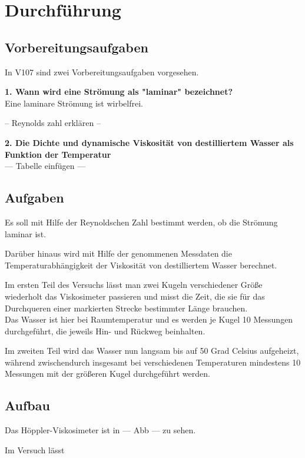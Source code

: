\section{Durchführung}
\label{sec:Durchführung}

\subsection{Vorbereitungsaufgaben}

In V107 sind zwei Vorbereitungsaufgaben vorgesehen.

\textbf{1. Wann wird eine Strömung als "laminar" bezeichnet?} \\
Eine laminare Strömung ist wirbelfrei.

-- Reynolds zahl erklären -- 


\textbf{2. Die Dichte und dynamische Viskosität von destilliertem Wasser als Funktion der Temperatur}\\
 --- Tabelle einfügen ---




\subsection{Aufgaben}
\label{subsec:Aufgaben}

Es soll mit Hilfe der Reynoldschen Zahl bestimmt werden, ob die Strömung laminar ist.

Darüber hinaus wird mit Hilfe der genommenen Messdaten die Temperaturabhängigkeit der Viskosität von
destilliertem Wasser berechnet. 

Im ersten Teil des Versuchs lässt man zwei Kugeln verschiedener Größe wiederholt das Viskosimeter 
passieren und misst die Zeit, die sie für das Durchqueren einer markierten Strecke bestimmter Länge brauchen. \\
Das Wasser ist hier bei Raumtemperatur und es werden je Kugel 10 Messungen durchgeführt, die jeweils Hin- und Rückweg 
beinhalten.

Im zweiten Teil wird das Wasser nun langsam bis auf 50 Grad Celsius aufgeheizt, während zwischendurch 
insgesamt bei verschiedenen Temperaturen mindestens 10 Messungen mit der größeren Kugel durchgeführt werden. 




\subsection{Aufbau}
\label{subsec:Aufbau}

Das Höppler-Viskosimeter ist in --- Abb --- zu sehen.

Im Versuch lässt 